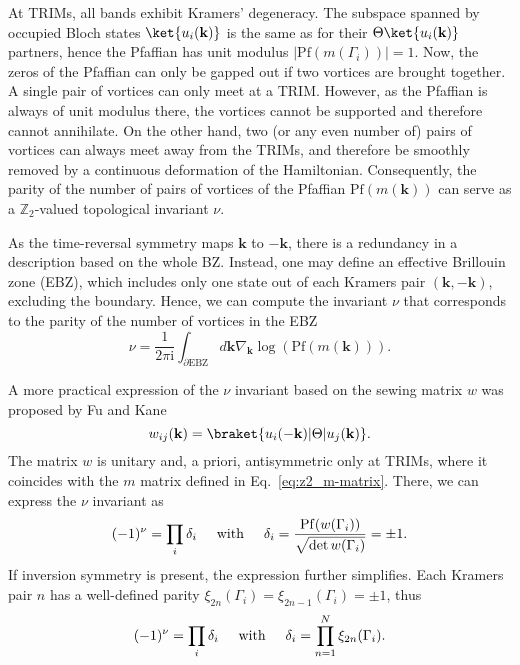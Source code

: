 At TRIMs, all bands exhibit Kramers' degeneracy. The subspace spanned by occupied Bloch states $\ket{u_i ( \mathbf{k} ) }$ is the same as for their $\Theta \ket{ u_i (\mathbf{k})}$ partners, hence the Pfaffian has unit modulus $|\mathrm{Pf} (m(\Gamma_i))| = 1$. Now, the zeros of the Pfaffian can only be gapped out if two vortices are brought together. A single pair of vortices can only meet at a TRIM. However, as the Pfaffian is always of unit modulus there, the vortices cannot be supported and therefore cannot annihilate. On the other hand, two (or any even number of) pairs of vortices can always meet away from the TRIMs, and therefore be smoothly removed by a continuous deformation of the Hamiltonian. Consequently, the parity of the number of pairs of vortices of the Pfaffian $\mathrm{Pf}(m(\mathbf{k}))$ can serve as a $\mathbb{Z}_2$-valued topological invariant $\nu$.

As the time-reversal symmetry maps $\mathbf{k}$ to $-\mathbf{k}$, there is a redundancy in a description based on the whole BZ. Instead, one may define an effective Brillouin zone (EBZ), which includes only one state out of each Kramers pair $(\mathbf{k}, -\mathbf{k})$, excluding the boundary. Hence, we can compute the invariant $\nu$ that corresponds to the parity of the number of vortices in the EBZ 
\begin{equation}
\nu = \frac{1}{2 \pi \mathrm{i} } \int_{\partial \mathrm{EBZ}} d \mathbf{k} \nabla_{\mathbf{k}} \log ( \mathrm{Pf}( m(\mathbf{k}))) .
\end{equation}

A more practical expression of the $\nu$ invariant based on the sewing matrix $w$ was proposed by Fu and Kane~\cite{PhysRevB.74.195312} 
\begin{equation}
w_{ij} ( \mathbf{k} ) = \braket{u_i (\mathbf{-k} ) | \Theta|  u_j (\mathbf{k}) }.
\label{eq:z2_w-matrix}
\end{equation}
The matrix $w$ is unitary and, a priori, antisymmetric only at TRIMs, where it coincides with the $m$ matrix defined in Eq.~\eqref{eq:z2_m-matrix}. There, we can express the $\nu$ invariant as
\begin{equation}
(-1)^{\nu} = \prod_{i}  \delta_i  \hspace*{0.5cm}  \mathrm{with}  \hspace*{0.5cm}  \delta_i  =  \frac{\mathrm{Pf} (w ( \Gamma_i)) }{\sqrt{\det w (\Gamma_i) }} = \pm 1.
\label{eq:pfaffian-z2}
\end{equation}
If inversion symmetry is present, the expression further simplifies. Each Kramers pair $n$ has a well-defined parity $\xi_{2n} (\Gamma_i) = \xi_{2n- 1} (\Gamma_i)  = \pm 1$, thus
\begin{equation}
 (-1)^{\nu} = \prod_i \delta_i   \hspace*{0.5cm} \mathrm{with} \hspace*{0.5cm}  \delta_i = \prod_{n = 1}^N  \xi_{2n} (\Gamma_i).
\label{eq:fukane}
\end{equation}


